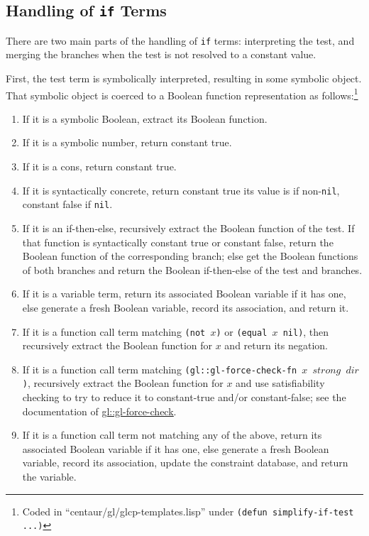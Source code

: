 \documentclass[submission,copyright,creativecommons]{eptcs}
\newcommand*{\var}[1]{\mathit{#1}}
\begin{document}
\subsection{Handling of \texttt{if} Terms}

There are two main parts of the handling of \texttt{if} terms:
interpreting the test, and merging the branches when the test is not
resolved to a constant value.

First, the test term is symbolically interpreted, resulting in some
symbolic object.  That symbolic object is coerced to a Boolean
function representation as follows:\footnote{Coded in
  ``centaur/gl/glcp-templates.lisp'' under \texttt{(defun
    simplify-if-test ...)}}
\begin{enumerate}
\item If it is a symbolic Boolean, extract its Boolean function.
\item If it is a symbolic number, return constant true.
\item If it is a cons, return constant true.
\item If it is syntactically concrete, return constant true its value is if non-\texttt{nil}, constant false if \texttt{nil}.
\item If it is an if-then-else, recursively extract the Boolean
  function of the test.  If that function is syntactically constant true or constant false, return
  the Boolean function of the corresponding branch; else get the
  Boolean functions of both branches and return the
  Boolean if-then-else of the test and branches.
\item If it is a variable term, return its associated Boolean variable
  if it has one, else generate a fresh Boolean variable, record its
  association, and return it.
\item If it is a function call term matching \texttt{(not $x$)} or
  \texttt{(equal $x$ nil)}, then recursively extract the Boolean
  function for $x$ and return its negation.
\item If it is a function call term matching
  \texttt{(gl::gl-force-check-fn $x$ $\var{strong}$ $\var{dir}$)},
  recursively extract the Boolean function for $x$ and use
  satisfiability checking to try to reduce it to constant-true and/or
  constant-false; see the documentation of
  \href{http://www.cs.utexas.edu/users/moore/acl2/manuals/current/manual/?topic=GL____GL-FORCE-CHECK}{\underline{gl::gl-force-check}}.
\item If it is a function call term not matching any of the above,
  return its associated Boolean variable if it has one, else generate
  a fresh Boolean variable, record its association, update the
  constraint database, and return the variable.
\end{enumerate}
\end{document}
